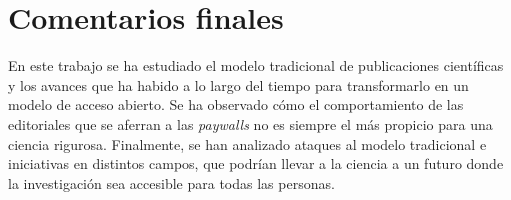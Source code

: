 

\section{Comentarios finales}

En este trabajo se ha estudiado el modelo tradicional de publicaciones científicas y los avances que ha habido a lo largo del tiempo para transformarlo en un modelo de acceso abierto. Se ha observado cómo el comportamiento de las editoriales que se aferran a las \textit{paywalls} no es siempre el más propicio para una ciencia rigurosa. Finalmente, se han analizado ataques al modelo tradicional e iniciativas en distintos campos, que podrían llevar a la ciencia a un futuro donde la investigación sea accesible para todas las personas.
